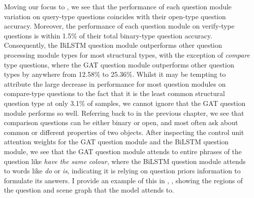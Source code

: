Moving our focus to \tableautorefname{ \ref{table:question_ablation_structural}}, we see that the performance of each question module variation on query-type questions coincides with their open-type question accuracy. Moreover, the performance of each question module on verify-type questions is within 1.5\% of their total binary-type question accuracy. Consequently, the BiLSTM question module outperforms other question processing module types for most structural types, with the exception of \textit{compare} type questions, where the GAT question module outperforms other question types by anywhere from 12.58\% to 25.36\%. Whilst it may be tempting to attribute the large decrease in performance for most question modules on compare-type questions to the fact that it is the least common structural question type at only 3.1\% of samples, we cannot ignore that the GAT question module performs so well. Referring back to \tableautorefname{ \ref{table:gqa_question_samples}} in the previous chapter, we see that comparison questions can be either binary or open, and most often ask about common or different properties of two objects. After inspecting the control unit attention weights for the GAT question module and the BiLSTM question module, we see that the GAT question module attends to entire phrases of the question like \textit{have the same colour}, where the BiLSTM question module attends to words like \textit{do} or \textit{is}, indicating it is relying on question priors information to formulate its answers. I provide an example of this in \appendixautorefname{ \ref{appendix:ablation_study_visualisations}}, \sectionautorefname{ \ref{section:question_processing_module_ablation_visualisations}}, showing the regions of the question and scene graph that the model attends to.

